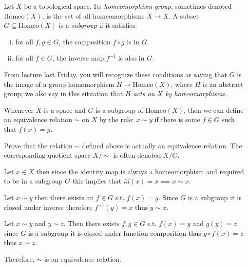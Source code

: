 \documentclass[12pt, letterpaper]{article}
\renewcommand{\t}[1]{\text{#1}}
\begin{document}
\begin{problem}{}
    Let $X$ be a topological space. Its \emph{homeomorphism group},
  sometimes denoted $\t{Homeo}(X)$, is the set of all homeomorphisms
  $X \to X$. A subset $G \subseteq \t{Homeo}(X)$ is a \emph{subgroup} if
  it satisfies:
  \begin{enumerate}[(i)]
  \item for all $f,g \in G$, the composition $f \circ g$ is in $G$.
  \item for all $f \in G$, the inverse map $f^{-1}$ is also in $G$.
  \end{enumerate}
  From lecture last Friday, you will recognize these conditions as
  saying that $G$ is the image of a group homomorphism
  $H \to \t{Homeo}(X)$, where $H$ is an abstract group; we also say in
  this situation that \emph{$H$ acts on $X$ by homeomorphisms}.

  Whenever $X$ is a space and $G$ is a subgroup of $\t{Homeo}(X)$, then
  we can define an equivalence relation $\sim$ on $X$ by the rule:
  $x \sim y$ if there is some $f \in G$ such that $f(x) = y$.
\end{problem}

\begin{subproblem}{}
    Prove that the relation $\sim$ defined above is actually an
    equivalence relation. The corresponding quotient space $X / \sim$
    is often denoted $X / G$.
\end{subproblem}
\begin{problemproof}
    Let $x \in X$ then since the identity map is always a homeomorphism and required to be in a subgroup $G$ this implies that $id(x)=x \implies x\sim x$.

    Let $x \sim y$ then there exists an $f \in G$ s.t. $f(x)=y$. Since $G$ is a subgroup it is closed under inverse therefore $f^{-1}(y)=x$ thus $y \sim x$.

    Let $x \sim y$ and $y \sim z$. Then there exists $f,g \in G$ s.t. $f(x)=y$ and $g(y)=z$ since $G$ is a subgroup it is closed under function composition thus $g \circ f(x)=z$ thus $x \sim z$.

    Therefore, $\sim$ is an equivalence relation.
\end{problemproof}
\end{document}
